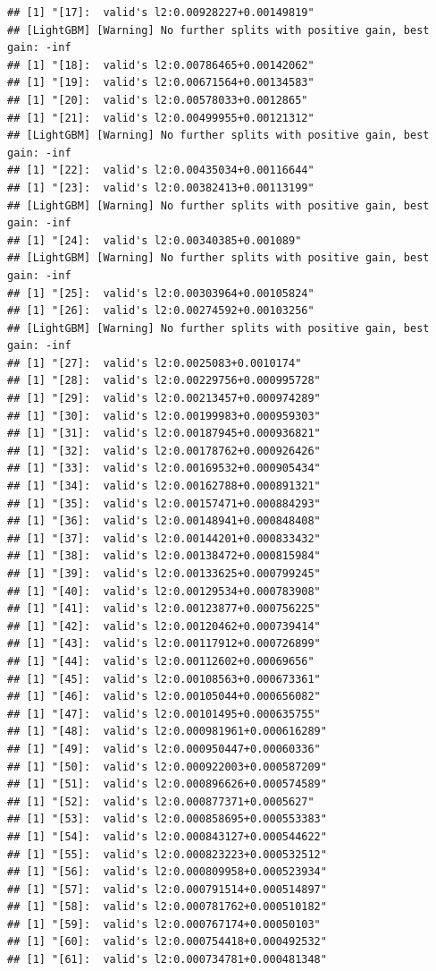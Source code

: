 \documentclass[
]{book}
\begin{document}
\begin{verbatim}
## [1] "[17]:  valid's l2:0.00928227+0.00149819"
## [LightGBM] [Warning] No further splits with positive gain, best gain: -inf
## [1] "[18]:  valid's l2:0.00786465+0.00142062"
## [1] "[19]:  valid's l2:0.00671564+0.00134583"
## [1] "[20]:  valid's l2:0.00578033+0.0012865"
## [1] "[21]:  valid's l2:0.00499955+0.00121312"
## [LightGBM] [Warning] No further splits with positive gain, best gain: -inf
## [1] "[22]:  valid's l2:0.00435034+0.00116644"
## [1] "[23]:  valid's l2:0.00382413+0.00113199"
## [LightGBM] [Warning] No further splits with positive gain, best gain: -inf
## [1] "[24]:  valid's l2:0.00340385+0.001089"
## [LightGBM] [Warning] No further splits with positive gain, best gain: -inf
## [1] "[25]:  valid's l2:0.00303964+0.00105824"
## [1] "[26]:  valid's l2:0.00274592+0.00103256"
## [LightGBM] [Warning] No further splits with positive gain, best gain: -inf
## [1] "[27]:  valid's l2:0.0025083+0.0010174"
## [1] "[28]:  valid's l2:0.00229756+0.000995728"
## [1] "[29]:  valid's l2:0.00213457+0.000974289"
## [1] "[30]:  valid's l2:0.00199983+0.000959303"
## [1] "[31]:  valid's l2:0.00187945+0.000936821"
## [1] "[32]:  valid's l2:0.00178762+0.000926426"
## [1] "[33]:  valid's l2:0.00169532+0.000905434"
## [1] "[34]:  valid's l2:0.00162788+0.000891321"
## [1] "[35]:  valid's l2:0.00157471+0.000884293"
## [1] "[36]:  valid's l2:0.00148941+0.000848408"
## [1] "[37]:  valid's l2:0.00144201+0.000833432"
## [1] "[38]:  valid's l2:0.00138472+0.000815984"
## [1] "[39]:  valid's l2:0.00133625+0.000799245"
## [1] "[40]:  valid's l2:0.00129534+0.000783908"
## [1] "[41]:  valid's l2:0.00123877+0.000756225"
## [1] "[42]:  valid's l2:0.00120462+0.000739414"
## [1] "[43]:  valid's l2:0.00117912+0.000726899"
## [1] "[44]:  valid's l2:0.00112602+0.00069656"
## [1] "[45]:  valid's l2:0.00108563+0.000673361"
## [1] "[46]:  valid's l2:0.00105044+0.000656082"
## [1] "[47]:  valid's l2:0.00101495+0.000635755"
## [1] "[48]:  valid's l2:0.000981961+0.000616289"
## [1] "[49]:  valid's l2:0.000950447+0.00060336"
## [1] "[50]:  valid's l2:0.000922003+0.000587209"
## [1] "[51]:  valid's l2:0.000896626+0.000574589"
## [1] "[52]:  valid's l2:0.000877371+0.0005627"
## [1] "[53]:  valid's l2:0.000858695+0.000553383"
## [1] "[54]:  valid's l2:0.000843127+0.000544622"
## [1] "[55]:  valid's l2:0.000823223+0.000532512"
## [1] "[56]:  valid's l2:0.000809958+0.000523934"
## [1] "[57]:  valid's l2:0.000791514+0.000514897"
## [1] "[58]:  valid's l2:0.000781762+0.000510182"
## [1] "[59]:  valid's l2:0.000767174+0.00050103"
## [1] "[60]:  valid's l2:0.000754418+0.000492532"
## [1] "[61]:  valid's l2:0.000734781+0.000481348"

\end{verbatim}
\end{document}
